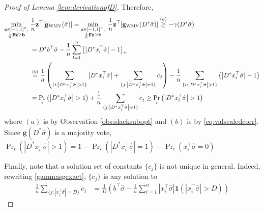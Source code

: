 \documentclass{colt2015} %
\newcommand{\vF}{\mathbf{F}}
\newcommand{\vb}{\mathbf{b}}
\newcommand{\vg}{\mathbf{g}}
\newcommand{\vz}{\mathbf{z}}
\DeclareMathOperator{\Prtxt}{Pr}
\newcommand{\ifn}{\mathbf{1}} %
\newcommand{\abs}[1]{\left| #1 \right|}
\newcommand{\prp}[2]{\Prtxt_{#2} \left(#1\right)}
\newcommand{\wmv}{\textsc{WMV}}
\newcommand{\sighat}{\hat{\sigma}}
\newcommand{\lrp}[1]{\left(#1\right)}
\begin{document}
\begin{proof}[Proof of Lemma \ref{lem:derivationofD}]
Therefore, 
\begin{align*}
\min_{\substack{ \vz \in [-1,1]^n , \\ \frac{1}{n} \vF \vz \geq \vb }} \;
&\frac{1}{n} \vz^\top [\vg_{\wmv} (\sighat)] 
= \min_{\substack{ \vz \in [-1,1]^n , \\ \frac{1}{n} \vF \vz \geq \vb }} \;\frac{1}{n} \vz^\top [\vg_{\wmv} (D^* \sighat)] 
\stackrel{(a)}{\geq} - \gamma (D^* \sighat) \\
&= D^* b^\top \sighat - \frac{1}{n} \sum_{l=1}^n \left[ \abs{D^* x_{l}^\top \sighat} - 1 \right]_{+} \\
&\stackrel{(b)}{=} \frac{1}{n} \lrp{ 
\sum_{\{i : \abs{D^* x_{i}^\top \sighat} > 1 \}} \abs{D^* x_{i}^\top \sighat} 
+ \sum_{\{j : \abs{D^* x_{j}^\top \sighat} = 1 \}} c_j } 
- \frac{1}{n} \sum_{\{i : \abs{D^* x_{i}^\top \sighat} > 1 \}} \lrp{ \abs{D^* x_{i}^\top \sighat} - 1 } \\
&= \prp{\abs{D^* x_{i}^\top \sighat} > 1}{i} + \frac{1}{n} \sum_{\{j : \abs{D^* x_{j}^\top \sighat} = 1 \}} c_j 
\geq \prp{\abs{D^* x_{i}^\top \sighat} > 1}{i}
\end{align*}
where $(a)$ is by Observation \ref{obs:slacksubopt} and 
$(b)$ is by \eqref{eq:valscaledcorr}. 
Since $\vg (D^* \sighat)$ is a majority vote, 
$\prp{\abs{D^* x_{i}^\top \sighat} > 1}{i} = 1 - \prp{\abs{D^* x_{i}^\top \sighat} = 1}{i} - \prp{ x_{i}^\top \sighat = 0}{i}$

Finally, note that a solution set of constants $\{c_j\}$ is not unique in general. 
Indeed, rewriting \eqref{gammasgexact}, $\{c_j\}$ is any solution to 
\begin{align*}
\frac{1}{n} \sum_{\{j : \abs{x_{j}^\top \sighat} = D \}} c_j 
&= \frac{1}{D } \lrp{ b^\top \sighat - \frac{1}{n} \sum_{i=1}^n \abs{x_{i}^\top \sighat} \ifn \lrp{ \abs{x_{i}^\top \sighat} > D } }
\end{align*}
\end{proof}
\end{document}
